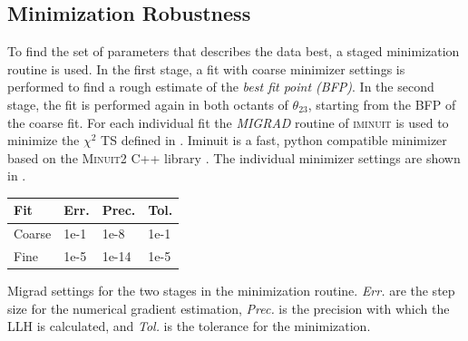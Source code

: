 \subsection{Minimization Robustness} 

To find the set of parameters that describes the data best, a staged minimization routine is used. In the first stage, a fit with coarse minimizer settings is performed to find a rough estimate of the \textit{best fit point (BFP)}. In the second stage, the fit is performed again in both octants of $\theta_{23}$, starting from the BFP of the coarse fit. For each individual fit the \textit{MIGRAD} routine of \textsc{iminuit}  is used to minimize the $\chi^2$ TS defined in . Iminuit is a fast, python compatible minimizer based on the \textsc{Minuit2} C++ library . The individual minimizer settings are shown in .

\begin{margintable}
    \small
        \begin{tabular}{ llll }
        \hline\hline
        \textbf{Fit} & \textbf{Err.} & \textbf{Prec.} & \textbf{Tol.} \\        
        \hline\hline    
        Coarse & 1e-1 & 1e-8 & 1e-1 \\
        Fine & 1e-5 & 1e-14 & 1e-5 \\    
        \hline
        \end{tabular}
    \caption[Staged minimization settings]{Migrad settings for the two stages in the minimization routine. \textit{Err.} are the step size for the numerical gradient estimation, \textit{Prec.} is the precision with which the LLH is calculated, and \textit{Tol.} is the tolerance for the minimization.}
\end{margintable}

